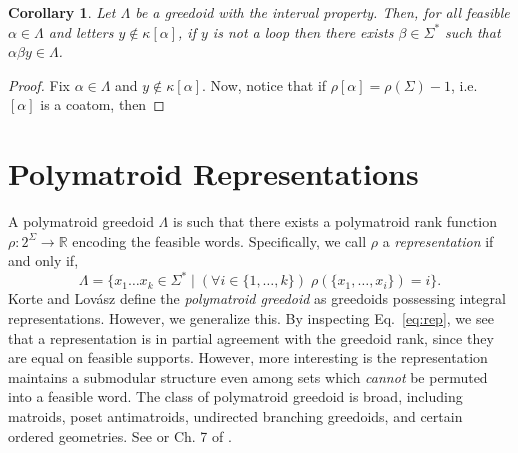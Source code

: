 \documentclass[11pt]{article}
\newtheorem{corollary}[theorem]{Corollary}
\newcommand{\univ}{\Sigma}
\newcommand{\glang}{\Lambda}
\providecommand{\L}{}
\renewcommand{\L}{\mathscr{L}}
\begin{document}
\begin{corollary}
    Let $\glang$ be a greedoid with the interval property.
    Then, for all feasible $\alpha \in \glang$ and letters $y \notin\kappa[\alpha]$, if $y$ is not a loop then there exists $\beta \in \univ^*$ such that $\alpha \beta y \in \glang$.
\end{corollary}
\begin{proof}
    Fix $\alpha \in \glang$ and $y \notin\kappa[\alpha]$.
    Now, notice that if $\rho[\alpha] = \rho(\univ) - 1$, i.e.\ $[\alpha]$ is a coatom, then 
\end{proof}
\fi

\section{Polymatroid Representations}\label{sec:pm-greedoid}

A polymatroid greedoid $\glang$ is such that there exists a polymatroid rank function $\rho:2^\univ\to\mathbb{R}$ encoding the feasible words.
Specifically, we call $\rho$ a \emph{representation} if and only if,
\begin{equation}\label{eq:rep}
    \glang = \{x_1\ldots x_k\in\univ^*\mid (\forall i \in \{1,\ldots,k\})\;\rho(\{x_1,\ldots,x_i\}) = i\}.
\end{equation}
Korte and Lov{\'a}sz define the \emph{polymatroid greedoid} as greedoids possessing integral representations.
However, we generalize this.
By inspecting Eq.~\ref{eq:rep}, we see that a representation is in partial agreement with the greedoid rank, since they are equal on feasible supports.
However, more interesting is the representation maintains a submodular structure even among sets which \emph{cannot} be permuted into a feasible word.
The class of polymatroid greedoid is broad, including matroids, poset antimatroids, undirected branching greedoids, and certain ordered geometries.
See \cite{korte1985polymatroid} or Ch. 7 of \cite{korte2012greedoids}.
\end{document}
